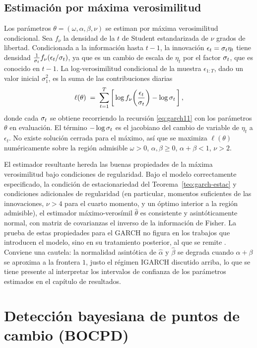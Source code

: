 \subsection{Estimación por máxima verosimilitud}
\label{sec:garch-mv}

Los parámetros $\theta = (\omega, \alpha, \beta, \nu)$ se estiman por máxima verosimilitud condicional. Sea $f_\nu$ la densidad de la $t$ de Student estandarizada de $\nu$ grados de libertad. Condicionada a la información hasta $t-1$, la innovación $\epsilon_t = \sigma_t \eta_t$ tiene densidad $\tfrac{1}{\sigma_t} f_\nu(\epsilon_t/\sigma_t)$, ya que es un cambio de escala de $\eta_t$ por el factor $\sigma_t$, que es conocido en $t-1$. La log-verosimilitud condicional de la muestra $\epsilon_{1:T}$, dado un valor inicial $\sigma_1^2$, es la suma de las contribuciones diarias
\[
\ell(\theta) \;=\; \sum_{t=1}^{T} \left[\, \log f_\nu\!\left(\frac{\epsilon_t}{\sigma_t}\right) - \log \sigma_t \,\right],
\]
donde cada $\sigma_t$ se obtiene recorriendo la recursión \eqref{eq:garch11} con los parámetros $\theta$ en evaluación. El término $-\log\sigma_t$ es el jacobiano del cambio de variable de $\eta_t$ a $\epsilon_t$. No existe solución cerrada para el máximo, así que se maximiza $\ell(\theta)$ numéricamente sobre la región admisible $\omega>0$, $\alpha,\beta\ge 0$, $\alpha+\beta<1$, $\nu>2$.

El estimador resultante hereda las buenas propiedades de la máxima verosimilitud bajo condiciones de regularidad. Bajo el modelo correctamente especificado, la condición de estacionariedad del Teorema~\ref{teo:garch-estac} y condiciones adicionales de regularidad (en particular, momentos suficientes de las innovaciones, $\nu>4$ para el cuarto momento, y un óptimo interior a la región admisible), el estimador máximo-verosímil $\hat\theta$ es consistente y asintóticamente normal, con matriz de covarianzas el inverso de la información de Fisher. La prueba de estas propiedades para el GARCH no figura en los trabajos que introducen el modelo, sino en su tratamiento posterior, al que se remite \cite{francqzakoian2019}. Conviene una cautela: la normalidad asintótica de $\hat\alpha$ y $\hat\beta$ se degrada cuando $\alpha+\beta$ se aproxima a la frontera $1$, justo el régimen IGARCH discutido arriba, lo que se tiene presente al interpretar los intervalos de confianza de los parámetros estimados en el capítulo de resultados.

\section{Detección bayesiana de puntos de cambio (BOCPD)}
\label{sec:bocpd}

